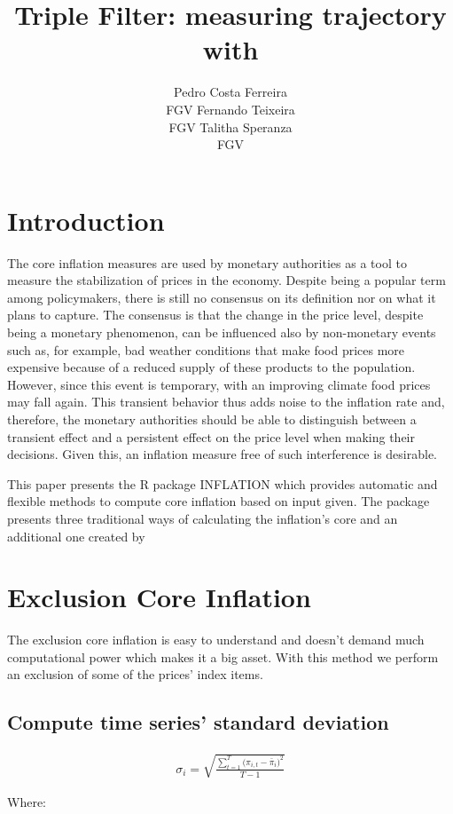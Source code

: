 \documentclass[article]{jss}
\author{
Pedro Costa Ferreira\\FGV \And Fernando Teixeira\\FGV \And Talitha Speranza\\FGV
}
\title{Triple Filter: measuring trajectory with \pkg{INFLATION}}
\begin{document}
\section{Introduction}\label{introduction}

The core inflation measures are used by monetary authorities as a tool
to measure the stabilization of prices in the economy. Despite being a
popular term among policymakers, there is still no consensus on its
definition nor on what it plans to capture. The consensus is that the
change in the price level, despite being a monetary phenomenon, can be
influenced also by non-monetary events such as, for example, bad weather
conditions that make food prices more expensive because of a reduced
supply of these products to the population. However, since this event is
temporary, with an improving climate food prices may fall again. This
transient behavior thus adds noise to the inflation rate and, therefore,
the monetary authorities should be able to distinguish between a
transient effect and a persistent effect on the price level when making
their decisions. Given this, an inflation measure free of such
interference is desirable.

This paper presents the R \citep{rproj} package INFLATION \citep{inf}
which provides automatic and flexible methods to compute core inflation
based on input given. The package presents three traditional ways of
calculating the inflation's core and an additional one created by
\citep{triple}

\section{Exclusion Core Inflation}\label{exclusion-core-inflation}

The exclusion core inflation is easy to understand and doesn't demand
much computational power which makes it a big asset. With this method we
perform an exclusion of some of the prices' index items.

\subsection{Compute time series' standard
deviation}\label{compute-time-series-standard-deviation}

\begin{align}
\sigma_{i} = \sqrt{\frac{\sum\nolimits_{t=1}^{T}{(\pi_{i,t}-\bar{\pi}_{i}})^2}{T-1}}
\end{align}

Where:
\end{document}
